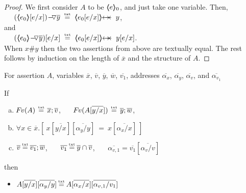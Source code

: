 \begin{proof}

\noindent 
We first consider $A$ to be $\langle\!\!\langle e \rangle\!\!\rangle_0$, and just take one variable. Then, \\
$\strut \ \ \ \ { \PushAS  {y} { (\inside {e_0}[e/x] ) } }
 \ \txteq\  {\protectedFrom {e_0[ {e/x}]} {y}}$, \\
and\\
$\strut \ \ \ \ (\PushAS {y} {\inside {e_0}})[e/x] \  \txteq\  \protectedFrom {e_0[{e/x}]} {y[ {e/x}]}$. \\
When $x \# y$  then the two assertions from above  are textually equal.
The rest follows by induction on the length of $\overline x$ and the structure of $A$.
\end{proof}
 

\begin{lemma}
 \label{l:sfs:eight}
For   assertion  $A$, variables $\overline {x}$, $\overline v$, $\overline y$, $\overline w$, $\overline {v_1}$,
addresses  $\overline {\alpha_x}$, $\overline {\alpha_y}$, $\overline {\alpha_v}$, and $\overline {\alpha_{v_1}}$

\noindent
If
\begin{enumerate}[a.]
\item
\label{l:sfs:eight:one}
 $\fv(A)\, \txteq \, \overline {x}; \overline v$, \ \ \ $\fv(A[\overline{y / x}] )\, \txteq  \,   \overline y; \overline w$, 
\item
\label{l:sfs:eight:two}
$ \forall x\in {\overline x}.[\ x[\overline{y/x}]  [\overline{\alpha_y/y}]\ =\  x[\overline{\alpha_x/x} ]  \ ]$
\item
\label{l:sfs:eight:three}
$\overline v \txteq  \overline {v_1}; \overline w$, \ \ \ $\overline {v_1}\txteq  \overline y\cap \overline v$, \ \ \ $ \overline {\alpha_{v,1} } = \overline {v_1}[\overline{\alpha_v/v} ]$
\end{enumerate}

\noindent
then

\begin{itemize}
\item
  $ A [\overline{y/x}] [\overline{\alpha_y/y}]%
  \txteq A [\overline{\alpha_x/x}] [\overline{\alpha_{v,1}/v_1}] $%
\end{itemize}

\end{lemma}

